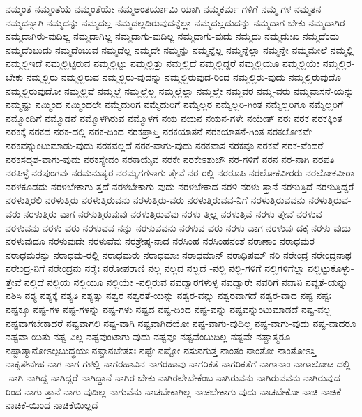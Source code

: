 {ನಮ್ಮಂತೆ
ನಮ್ಮಂತೆಯೆ
ನಮ್ಮಂತೆಯೇ
ನಮ್ಮಅಂತರ್ಯಾಮಿ-ಯಾಗಿ
ನಮ್ಮಕರ್ಮ-ಗಳಿಗೆ
ನಮ್ಮ-ಗಳ
ನಮ್ಮತನ
ನಮ್ಮದನ್ನಾಗಿ
ನಮ್ಮದನ್ನು
ನಮ್ಮದಲ್ಲ
ನಮ್ಮದಲ್ಲದಿರುವುದನ್ನೆಲ್ಲಾ
ನಮ್ಮದಲ್ಲದುದನ್ನು
ನಮ್ಮದಾಗ-ಬೇಕು
ನಮ್ಮದಾಗಿರ
ನಮ್ಮದಾಗಿರು-ವುದಿಲ್ಲ
ನಮ್ಮದಾಗಿಲ್ಲ
ನಮ್ಮದಾಗು-ವುದಿಲ್ಲ
ನಮ್ಮದಾಗು-ವುದು
ನಮ್ಮದು
ನಮ್ಮದುಃಖ
ನಮ್ಮದೆಂದು
ನಮ್ಮದೆಂಬುದು
ನಮ್ಮದೆಂಬುವ
ನಮ್ಮದೆಲ್ಲ
ನಮ್ಮದೇ
ನಮ್ಮನ್ನು
ನಮ್ಮನ್ನೆಲ್ಲ
ನಮ್ಮನ್ನೆಲ್ಲಾ
ನಮ್ಮನ್ನೇ
ನಮ್ಮಮೇಲೆ
ನಮ್ಮಲ್ಲಿ
ನಮ್ಮಲ್ಲಿಇದೆ
ನಮ್ಮಲ್ಲಿಟ್ಟಿರುವ
ನಮ್ಮಲ್ಲಿಟ್ಟು
ನಮ್ಮಲ್ಲಿತ್ತು
ನಮ್ಮಲ್ಲಿದೆ
ನಮ್ಮಲ್ಲಿದ್ದರೆ
ನಮ್ಮಲ್ಲಿಯೂ
ನಮ್ಮಲ್ಲಿಯೇ
ನಮ್ಮಲ್ಲಿರ-ಬೇಕು
ನಮ್ಮಲ್ಲಿರು
ನಮ್ಮಲ್ಲಿರುವ
ನಮ್ಮಲ್ಲಿರು-ವುದನ್ನು
ನಮ್ಮಲ್ಲಿರುವುದ-ರಿಂದ
ನಮ್ಮಲ್ಲಿರು-ವುದು
ನಮ್ಮಲ್ಲಿರುವುದೊ
ನಮ್ಮಲ್ಲಿರುವುದೋ
ನಮ್ಮಲ್ಲಿವೆ
ನಮ್ಮಲ್ಲೆ
ನಮ್ಮಲ್ಲೆಲ್ಲ
ನಮ್ಮಲ್ಲೆಲ್ಲಾ
ನಮ್ಮಲ್ಲೇ
ನಮ್ಮವರ
ನಮ್ಮ-ವರು
ನಮ್ಮವಾಸನೆ-ಯನ್ನು
ನಮ್ಮಷ್ಟು
ನಮ್ಮಿಂದ
ನಮ್ಮಿಂದಲೇ
ನಮ್ಮೆದುರಿಗ
ನಮ್ಮೆದುರಿಗೆ
ನಮ್ಮೆಲ್ಲರ
ನಮ್ಮೆಲ್ಲರಿ-ಗಿಂತ
ನಮ್ಮೆಲ್ಲರಿಗೂ
ನಮ್ಮೆಲ್ಲರಿಗೆ
ನಮ್ಮೊಂದಿಗೆ
ನಮ್ಮೊಡನೆ
ನಮ್ಮೊಳಗಿರುವ
ನಮ್ಮೊಳಗೆ
ನಯ
ನಯನ
ನಯನ-ಗಳೇ
ನಯೇತ್
ನರಃ
ನರಕ
ನರಕಕ್ಕಿಂತ
ನರಕಕ್ಕೆ
ನರಕದ
ನರಕ-ದಲ್ಲಿ
ನರಕ-ದಿಂದ
ನರಕಪ್ರಾಪ್ತಿ
ನರಕಯಾತನೆ
ನರಕಯಾತನೆ-ಗಿಂತ
ನರಕಲೋಕವೇ
ನರಕವನ್ನುಂಟುಮಾಡು-ವುದು
ನರಕವಲ್ಲದೆ
ನರಕ-ವಾಗು-ವುದು
ನರಕವಾಸ
ನರಕವೂ
ನರಕವೆ
ನರಕ-ವೆಂದರೆ
ನರಕಸದೃಶ-ವಾಗು-ವುದು
ನರಕಸ್ಯೇದಂ
ನರಕಾಯೈವ
ನರಕೇ
ನರಕೇಽಶುಚೌ
ನರ-ಗಳಿಗೆ
ನರನ
ನರ-ನಾಗಿ
ನರಪತಿ
ನರಪಿಳ್ಳೆ
ನರಪುಂಗವಃ
ನರಮನುಷ್ಯರ
ನರಮೃಗಗಳಾಗು-ತ್ತೇವೆ
ನರ-ರಲ್ಲಿ
ನರರೂಪಿ
ನರಲೋಕವೀರರು
ನರಲೋಕವೀರಾ
ನರಳಕೂಡದು
ನರಳಬೇಕಾಗು-ತ್ತದೆ
ನರಳಬೇಕಾಗು-ವುದು
ನರಳಬೇಕಾದ
ನರಳಿ
ನರಳು-ತ್ತಾನೆ
ನರಳುತ್ತಿದೆ
ನರಳುತ್ತಿದ್ದರೆ
ನರಳುತ್ತಿರಲಿ
ನರಳುತ್ತಿರು
ನರಳುತ್ತಿರುವನು
ನರಳುತ್ತಿರು-ವರು
ನರಳುತ್ತಿರುವವ-ನಿಗೆ
ನರಳುತ್ತಿರುವವನು
ನರಳುತ್ತಿರುವ-ವರು
ನರಳುತ್ತಿರು-ವಾಗ
ನರಳುತ್ತಿರುವುವು
ನರಳುತ್ತಿರುವೆವು
ನರಳು-ತ್ತಿಲ್ಲ
ನರಳುತ್ತಿವೆ
ನರಳು-ತ್ತೇವೆ
ನರಳುವ
ನರಳುವನು
ನರಳು-ವರು
ನರಳುವವ-ನನ್ನು
ನರಳುವವನು
ನರಳುವ-ವರು
ನರಳು-ವಾಗ
ನರಳುವು-ದಕ್ಕೆ
ನರಳು-ವುದು
ನರಳುವುದೂ
ನರಳುವುದೇ
ನರಳುವೆವು
ನರಶ್ರೇಷ್ಠ-ನಾದ
ನರಸಿಂಹ
ನರಸಿಂಹನಂತೆ
ನರಾಣಾಂ
ನರಾಧಮರ
ನರಾಧಮರನ್ನು
ನರಾಧಮ-ರಲ್ಲಿ
ನರಾಧಮರು
ನರಾಧಮಾಃ
ನರಾಧಮಾನ್
ನರಾಧಿಪಮ್
ನರಿ
ನರೇಂದ್ರ
ನರೇಂದ್ರನಾಥ
ನರೇಂದ್ರ-ನಿಗೆ
ನರೇಂದ್ರನು
ನರೈಃ
ನರೋಪರಾಣಿ
ನಲ್ಲ
ನಲ್ಲದ
ನಲ್ಲದೆ
-ನಲ್ಲಿ
ನಲ್ಲಿ-ಗಳಿಗೆ
ನಲ್ಲಿಗಳಿಗೆಲ್ಲಾ
ನಲ್ಲಿಟ್ಟುಕೊಳ್ಳು-ತ್ತೇವೆ
ನಲ್ಲಿದೆ
ನಲ್ಲಿಯ
ನಲ್ಲಿಯೂ
ನಲ್ಲಿಯೇ
-ನಲ್ಲಿರುವ
ನವದ್ವಾರಗಳುಳ್ಳ
ನವದ್ವಾರೇ
ನವರಿಗೆ
ನವಾನಿ
ನವ್ಯತೆ-ಯನ್ನು
ನಶಿಸಿ
ನಶ್ಯ
ನಶ್ಯಕ್ಕೆ
ನಶ್ಯತಿ
ನಶ್ಯತ್ಸು
ನಶ್ವರ
ನಶ್ವರತೆ-ಯನ್ನು
ನಶ್ವರ-ವನ್ನು
ನಶ್ವರವಾಗದೆ
ನಶ್ವರ-ವಾದ
ನಷ್ಟ
ನಷ್ಟಃ
ನಷ್ಟಕ್ಕೂ
ನಷ್ಟ-ಗಳ
ನಷ್ಟ-ಗಳನ್ನು
ನಷ್ಟ-ಗಳು
ನಷ್ಟದ
ನಷ್ಟ-ದಿಂದ
ನಷ್ಟ-ವನ್ನು
ನಷ್ಟವನ್ನುಂಟುಮಾಡದೆ
ನಷ್ಟ-ವಲ್ಲ
ನಷ್ಟವಾಗಬೇಕಾದರೆ
ನಷ್ಟವಾಗಲಿ
ನಷ್ಟ-ವಾಗಿ
ನಷ್ಟವಾಗಿದೆಯೋ
ನಷ್ಟ-ವಾಗು-ವುದಿಲ್ಲ
ನಷ್ಟ-ವಾಗು-ವುದು
ನಷ್ಟ-ವಾದರೂ
ನಷ್ಟವಾ-ಯಿತು
ನಷ್ಟ-ವಿಲ್ಲ
ನಷ್ಟವುಂಟಾಗು-ವುದು
ನಷ್ಟವೂ
ನಷ್ಟವೆಂಬುದಿಲ್ಲ
ನಷ್ಟವೇ
ನಷ್ಟಾತ್ಮರೂ
ನಷ್ಟಾತ್ಮಾನೋಽಲ್ಪಬುದ್ಧಯಃ
ನಷ್ಟಾನಚೇತಸಃ
ನಷ್ಟೇ
ನಷ್ಟೋ
ನಸುನಗುತ್ತ
ನಾಂತಂ
ನಾಂತೋ
ನಾಂತೋಽಸ್ತಿ
ನಾಕೃತೇನೇಹ
ನಾಗ
ನಾಗ-ಗಳಲ್ಲಿ
ನಾಗರಹಾವಿನ
ನಾಗರಹಾವು
ನಾಗರಿಕತೆ
ನಾಗರಿಕತೆಗೆ
ನಾಗಾನಾಂ
ನಾಗಾಲೋಟ-ದಲ್ಲಿ
-ನಾಗಿ
ನಾಗಿದ್ದ
ನಾಗಿದ್ದರೆ
ನಾಗಿದ್ದಾನೆ
ನಾಗಿರ-ಬೇಕು
ನಾಗಿರಲೇಬೇಕೆಂಬ
ನಾಗಿರುವನು
ನಾಗಿರುವವನು
ನಾಗಿರುವುದ-ರಿಂದ
ನಾಗು-ತ್ತಾನೆ
ನಾಗು-ವುದಿಲ್ಲ
ನಾಗುವೆನು
ನಾಚಬೇಕಾಗಿಲ್ಲ
ನಾಚಬೇಕಾಗು-ವುದು
ನಾಚಬೇಕೋ
ನಾಚಿ
ನಾಚಿಕೆ
ನಾಚಿಕೆ-ಯಿಂದ
ನಾಚಿಕೆಯಿಲ್ಲದೆ
}
